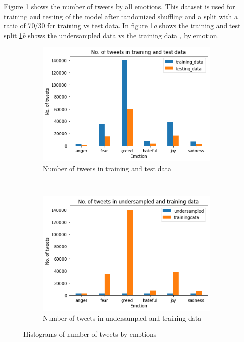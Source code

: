 \documentclass[a4paper, 12pt]{article}
\begin{document}
Figure \ref{fig:tweetsdata} shows the number of tweets by all emotions. This dataset is used for training and testing of the model after randomized shuffling and a split with a ratio of 70/30 for training vs test data.
In figure \ref{fig:tweetsdata}\textit{a} shows the training and test split \ref{fig:tweetsdata}\textit{b} shows the undersampled data vs the training data , by emotion.
\begin{figure}[H]
    \centering
    \begin{subfigure}[b]{0.48\textwidth}
        \includegraphics[width=\textwidth]{res/training_test.png}
        \caption{Number of tweets in training and test data}
    \end{subfigure}
    ~ %
    \begin{subfigure}[b]{0.48\textwidth}
        \includegraphics[width=\textwidth]{res/undersampled_training.png}
        \caption{Number of tweets in undersampled and training data}
    \end{subfigure}
    \caption{Histograms of number of tweets by emotions}
    \label{fig:tweetsdata}
\end{figure}
\end{document}
